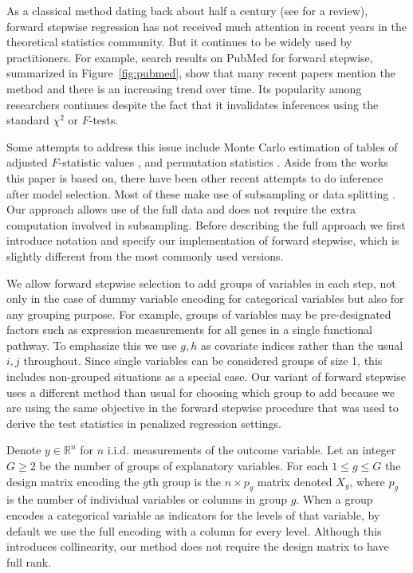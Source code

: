 \documentclass{imsart}
\newcommand{\real}{\mathbb{R}}
\begin{document}
As a classical method dating back about half a century
(see \cite{classical:selection} for a review),
forward stepwise regression has not received much attention in
recent years in the theoretical statistics community. But it continues
to be widely used by practitioners.
For example, search results on PubMed for forward stepwise,
summarized in Figure~\ref{fig:pubmed}, show that many recent
papers mention the method and there is an increasing trend over time.
Its popularity among researchers continues despite the fact that it
invalidates inferences using the standard $\chi^2$ or $F$-tests.


Some attempts to address this issue include Monte Carlo
estimation of tables of adjusted $F$-statistic values \citep{mc:ftoenter},
and permutation statistics \citep{permutation:stop}. Aside from the works
this paper is based on, there have been other recent attempts to do
inference after model selection. Most of these make use of subsampling
\citep{meinshausen:buhlmann} or data splitting \citep{wasserman:roeder}.
Our approach allows use of the full data and does not require the
extra computation involved in subsampling.
Before describing the full approach we first introduce notation and
specify our implementation of forward stepwise, which is slightly
different from the most commonly used versions.


We allow forward stepwise selection to add groups of variables in each
step, not only in the case of dummy variable encoding for categorical
variables but also for any grouping purpose. For example, groups of
variables may be pre-designated factors such as expression
measurements for all genes in a single functional pathway.
To emphasize this we use $g, h$ as covariate indices rather than the usual
$i, j$ throughout. Since single variables can be considered groups of
size 1, this includes non-grouped situations as a special
case. Our variant of forward stepwise uses a different method than
usual for choosing which group to add because we are using the
same objective in the forward stepwise procedure that was used to
derive the test statistics in penalized regression settings.

Denote $y \in \real^n$ for $n$ i.i.d. measurements of the outcome variable.
Let an integer $G \geq 2$ be the number of groups of explanatory variables.
For each $1 \leq g \leq G$ the design matrix encoding the
$g$th group is the $n \times p_g$ matrix denoted $X_g$, where $p_g$ is
the number of individual variables or columns in group $g$.
When a group encodes a categorical variable as indicators for the
levels of that variable, by default we use the full encoding with a
column for every level. Although this introduces collinearity, our method
does not require the design matrix to have full rank.
\end{document}
